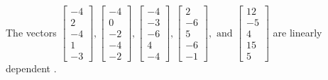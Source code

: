 \begin{exercise}
\begin{exerciseStatement}
  \end{exerciseStatement}
  \begin{exerciseAnswer}
   The vectors \(\left[\begin{array}{r}
-4 \\
2 \\
-4 \\
1 \\
-3
\end{array}\right] , \left[\begin{array}{r}
-4 \\
0 \\
-2 \\
-4 \\
-2
\end{array}\right] , \left[\begin{array}{r}
-4 \\
-3 \\
-6 \\
4 \\
-4
\end{array}\right] , \left[\begin{array}{r}
2 \\
-6 \\
5 \\
-6 \\
-1
\end{array}\right] , \text{ and } \left[\begin{array}{r}
12 \\
-5 \\
4 \\
15 \\
5
\end{array}\right]\) are 
  	 linearly dependent  .
  


  \end{exerciseAnswer}
\end{exercise}